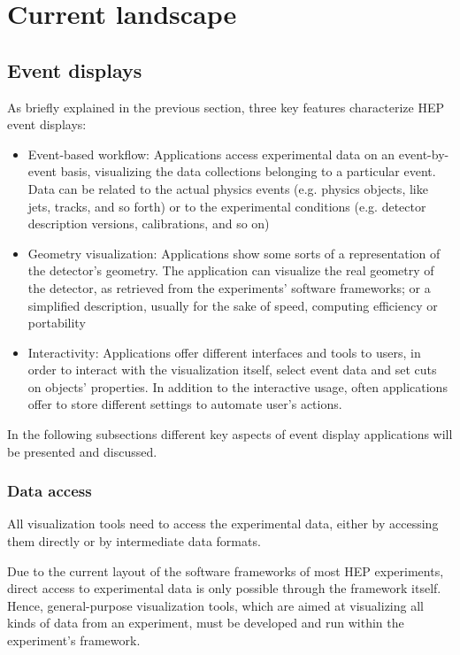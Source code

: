 \documentclass[12pt,a4paper]{article}
\begin{document}
\hypertarget{current-landscape}{%
\section{Current landscape}\label{current-landscape}}

\hypertarget{event-displays}{%
\subsection{Event displays}\label{event-displays}}

As briefly explained in the previous section, three key features characterize HEP event displays:

\begin{itemize}
\item Event-based workflow: Applications access experimental data on an event-by-event basis,
visualizing the data collections belonging to a particular event. Data can be related to the
actual physics events (e.g. physics objects, like jets, tracks, and so forth) or to the experimental
conditions (e.g. detector description versions, calibrations, and so on)
\item Geometry visualization: Applications show some sorts of a representation of the detector’s geometry.
The application can visualize the real geometry of the detector, as retrieved from the experiments’ software
  frameworks; or a simplified description, usually for the sake of speed, computing efficiency or portability
\item Interactivity: Applications offer different interfaces and tools to users, in order to interact
with the visualization itself, select event data and set cuts on objects’ properties.
In addition to the interactive usage, often applications offer to store different settings to automate user’s actions.
\end{itemize}

In the following subsections different key aspects of event display applications will be presented and discussed.

\hypertarget{data-access}{%
\subsubsection{Data access}\label{data-access}}

All visualization tools need to access the experimental data, either by accessing them directly or by intermediate data formats.

Due to the current layout of the software frameworks of most HEP experiments, direct access to experimental data
is only possible through the framework itself. Hence, general-purpose visualization tools, which are aimed at visualizing
all kinds of data from an experiment, must be developed and run within the experiment’s framework.
\end{document}
